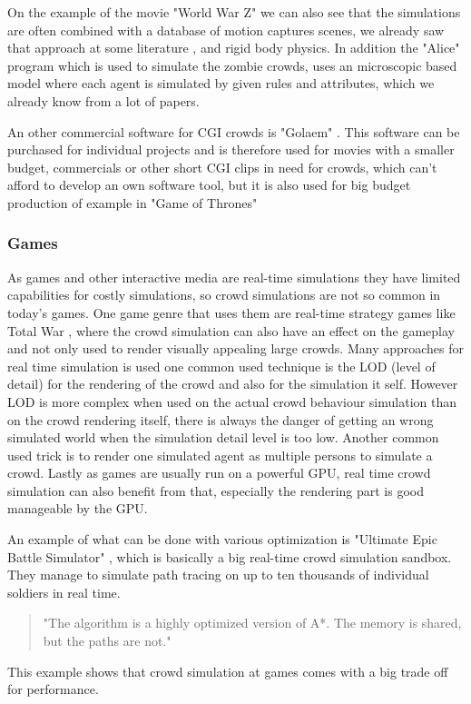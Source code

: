 \documentclass{acmsiggraph}               %
\begin{document}
On the example of the movie "World War Z" we can also see that the simulations are often combined with a database of motion captures scenes, we already saw that approach at some literature \cite{thalmann_crowd_2013}, and rigid body physics. In addition the "Alice" program which is used to simulate the zombie crowds, uses an microscopic based model where each agent is simulated by given rules and attributes, which we already know from a lot of papers. \cite{wired_worldwarz_doku} 

An other commercial software for CGI crowds is "Golaem" \cite{golaem_website}. This software can be purchased for individual projects and is therefore used for movies with a smaller budget, commercials or other short CGI clips in need for crowds, which can't afford to develop an own software tool, but it is also used for big budget production of example in "Game of Thrones" \cite{golaem_got_vid}

\subsubsection{Games}

As games and other interactive media are real-time simulations they have limited capabilities for costly simulations, so crowd simulations are not so common in today's games. One game genre that uses them are real-time strategy games like Total War \cite{total_war_website}, where the crowd simulation can also have an effect on the gameplay and not only used to render visually appealing large crowds. 
Many approaches for real time simulation is used one common used technique is the LOD (level of detail) for the rendering of the crowd and also for the simulation it self. However LOD is more complex when used on the actual crowd behaviour simulation than on the crowd rendering itself, there is always the danger of getting an wrong simulated world when the simulation detail level is too low. Another common used trick is to render one simulated agent as multiple persons to simulate a crowd. Lastly as games are usually run on a powerful GPU, real time crowd simulation can also benefit from that, especially the rendering part is good manageable by the GPU. \cite{thalmann_crowd_2013}

An example of what can be done with various optimization is "Ultimate Epic Battle Simulator" \cite{ultimeEpicBattleSim_video} , which is basically a big real-time crowd simulation sandbox. They manage to simulate path tracing on up to ten thousands of individual soldiers in real time. 
\begin{quote}
"The algorithm is a highly optimized version of A*.  \label{term:A*Usage} The memory is shared, but the paths are not." \cite{ultimeEpicBattleSim_video}
\end{quote} This example shows that crowd simulation at games comes with a big trade off for performance. 
\end{document}
